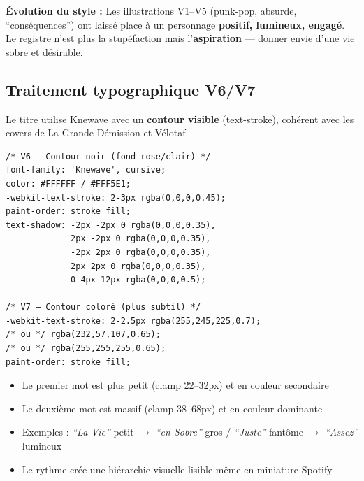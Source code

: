 \documentclass[a4paper,11pt]{article}
\begin{document}
\begin{tcolorbox}[card, colframe=consoYellow!50]
\textbf{Évolution du style :} Les illustrations V1--V5 (punk-pop, absurde, ``conséquences'') ont laissé place à un personnage \textbf{positif, lumineux, engagé}. Le registre n'est plus la stupéfaction mais l'\textbf{aspiration} — donner envie d'une vie sobre et désirable.
\end{tcolorbox}

\subsection{Traitement typographique V6/V7}

Le titre utilise Knewave avec un \textbf{contour visible} (text-stroke), cohérent avec les covers de La Grande Démission et Vélotaf.

\begin{tcolorbox}[card, colback=consoNavy, coltext=white!90]
\begin{verbatim}
/* V6 — Contour noir (fond rose/clair) */
font-family: 'Knewave', cursive;
color: #FFFFFF / #FFF5E1;
-webkit-text-stroke: 2-3px rgba(0,0,0,0.45);
paint-order: stroke fill;
text-shadow: -2px -2px 0 rgba(0,0,0,0.35),
             2px -2px 0 rgba(0,0,0,0.35),
             -2px 2px 0 rgba(0,0,0,0.35),
             2px 2px 0 rgba(0,0,0,0.35),
             0 4px 12px rgba(0,0,0,0.5);

/* V7 — Contour coloré (plus subtil) */
-webkit-text-stroke: 2-2.5px rgba(255,245,225,0.7);
/* ou */ rgba(232,57,107,0.65);
/* ou */ rgba(255,255,255,0.65);
paint-order: stroke fill;
\end{verbatim}
\end{tcolorbox}

\begin{tcolorbox}[card, title=Split ``petit mot + gros mot'']
\begin{itemize}[nosep]
  \item Le premier mot est plus petit (clamp 22--32px) et en couleur secondaire
  \item Le deuxième mot est massif (clamp 38--68px) et en couleur dominante
  \item Exemples : \textit{``La Vie''} petit $\rightarrow$ \textit{``en Sobre''} gros / \textit{``Juste''} fantôme $\rightarrow$ \textit{``Assez''} lumineux
  \item Le rythme crée une hiérarchie visuelle lisible même en miniature Spotify
\end{itemize}
\end{tcolorbox}
\end{document}
